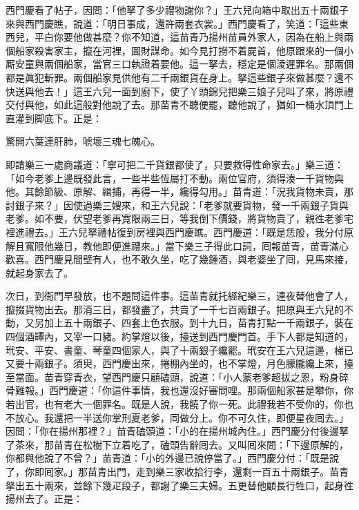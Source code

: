 西門慶看了帖子，因問：「他拏了多少禮物謝你？」王六兒向箱中取出五十兩銀子來與西門慶瞧，說道：「明日事成，還許兩套衣裳。」西門慶看了，笑道：「這些東西兒，平白你要他做甚麼？你不知道，這苗青乃揚州苗員外家人，因為在船上與兩個船家殺害家主，攛在河裡，圖財謀命。如今見打撈不着屍首，他原跟來的一個小厮安童與兩個船家，當官三口執證着要他。這一拏去，穩定是個淩遲罪名。那兩個都是眞犯斬罪。兩個船家見供他有二千兩銀貨在身上。拏這些銀子來做甚麼？還不快送與他去！」這王六兒一面到廚下，使了丫頭錦兒把樂三娘子兒叫了來，將原禮交付與他，如此這般對他說了去。那苗青不聽便罷，聽他說了，猶如一桶水頂門上直灌到脚底下。正是：

\begin{myquote}
驚開六葉連肝肺，唬壞三魂七魄心。
\end{myquote}

即請樂三一處商議道：「寧可把二千貨銀都使了，只要救得性命家去。」樂三道：「如今老爹上邊既發此言，一些半些恆屬打不動。兩位官府，須得湊一千貨物與他。其餘節級、原解、緝捕，再得一半，纔得勾用。」苗青道：「況我貨物未賣，那討銀子來？」因使過樂三嫂來，和王六兒說：「老爹就要貨物，發一千兩銀子貨與老爹。如不要，伏望老爹再寬限兩三日，等我倒下價錢，將貨物賣了，親徃老爹宅裡進禮去。」王六兒拏禮帖復到房裡與西門慶瞧。西門慶道：「既是恁般，我分付原解且寬限他幾日，教他即便進禮來。」當下樂三子得此口詞，囘報苗青，苗青滿心歡喜。西門慶見間壁有人，也不敢久坐，吃了幾鍾酒，與老婆坐了囘，見馬來接，就起身家去了。

次日，到衙門早發放，也不題問這件事。這苗青就托經紀樂三，連夜替他會了人，攛掇貨物出去。那消三日，都發盡了，共賣了一千七百兩銀子。把原與王六兒的不動，又另加上五十兩銀子、四套上色衣服。到十九日，苗青打點一千兩銀子，裝在四個酒罈內，又宰一口豬。約掌燈以後，擡送到西門慶門首。手下人都是知道的，玳安、平安、書童、琴童四個家人，與了十兩銀子纔罷。玳安在王六兒這邊，梯已又要十兩銀子。須臾，西門慶出來，捲棚內坐的，也不掌燈，月色朦朧纔上來，{}擡至當面。苗青穿青衣，望西門慶只顧磕頭，說道：「小人蒙老爹超拔之恩，粉身碎骨難報。」西門慶道：「你這件事情，我也還沒好審問哩。那兩個船家甚是攀你，你若出官，也有老大一個罪名。既是人說，我饒了你一死。此禮我若不受你的，你也不放心。我還把一半送你掌刑夏老爹，同做分上。你不可久住，即便星夜囘去。」因問：「你在揚州那裡？」苗青磕頭道：「小的在揚州城內住。」西門慶分付後邊拏了茶來，那苗青在松樹下立着吃了，磕頭告辭囘去。又叫囘來問：「下邊原解的，你都與他說了不曾？」苗青道：「小的外邊已說停當了。」西門慶分付：「既是說了，你即囘家。」那苗青出門，走到樂三家收拾行李，還剩一百五十兩銀子。苗青拏出五十兩來，並餘下幾疋段子，都謝了樂三夫婦。五更替他顧長行牲口，起身徃揚州去了。正是：

